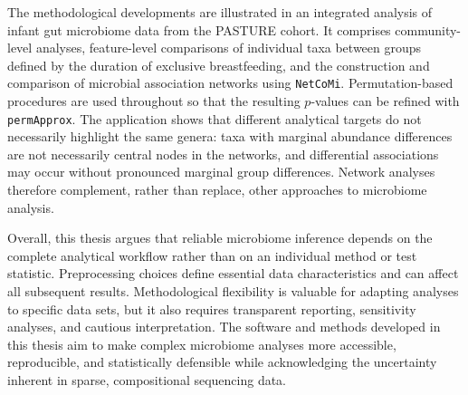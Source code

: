 The methodological developments are illustrated in an integrated analysis of infant gut microbiome data from the PASTURE cohort. It comprises community-level analyses, feature-level comparisons of individual taxa between groups defined by the duration of exclusive breastfeeding, and the construction and comparison of microbial association networks using \texttt{NetCoMi}. Permutation-based procedures are used throughout so that the resulting $p$-values can be refined with \texttt{permApprox}. The application shows that different analytical targets do not necessarily highlight the same genera: taxa with marginal abundance differences are not necessarily central nodes in the networks, and differential associations may occur without pronounced marginal group differences. Network analyses therefore complement, rather than replace, other approaches to microbiome analysis.

Overall, this thesis argues that reliable microbiome inference depends on the complete analytical workflow rather than on an individual method or test statistic. Preprocessing choices define essential data characteristics and can affect all subsequent results. Methodological flexibility is valuable for adapting analyses to specific data sets, but it also requires transparent reporting, sensitivity analyses, and cautious interpretation. The software and methods developed in this thesis aim to make complex microbiome analyses more accessible, reproducible, and statistically defensible while acknowledging the uncertainty inherent in sparse, compositional sequencing data.


\cleardoublepage
